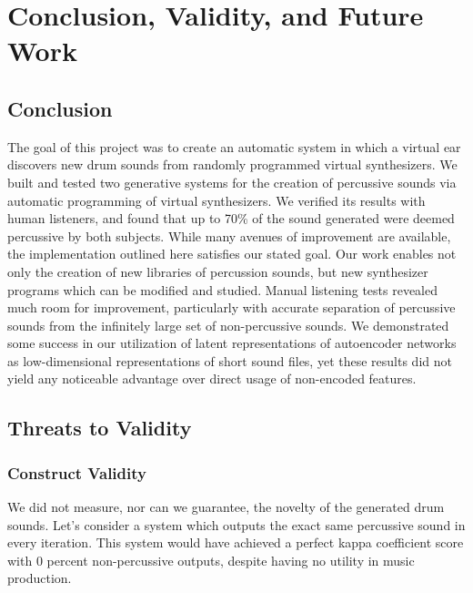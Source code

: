 \documentclass[\main/thesis.tex]{subfiles}
\begin{document}
\chapter{Conclusion, Validity, and Future Work} 

\section{Conclusion}  The goal of this project was to create an automatic system in which a virtual ear discovers new drum sounds from randomly programmed virtual synthesizers. We built and tested two generative systems for the creation of percussive sounds via automatic programming of virtual synthesizers. We verified its results with human listeners, and found that up to 70\% of the sound generated were deemed percussive by both subjects. While many avenues of improvement are available, the implementation outlined here satisfies our stated goal. 
Our work enables not only the creation of new libraries of percussion sounds, but new synthesizer programs which can be modified and studied. 
Manual listening tests revealed much room for improvement, particularly with accurate separation of percussive sounds from the infinitely large set of non-percussive sounds. We demonstrated some success in our utilization of latent representations of autoencoder networks as low-dimensional representations of short sound files, yet these results did not yield any noticeable advantage over direct usage of non-encoded features.
\section{Threats to Validity}
 
\subsection{Construct Validity}
  We did not measure, nor can we guarantee, the novelty of the generated drum sounds. Let's consider a system which outputs the exact same percussive sound in every iteration. This system would have achieved a perfect kappa coefficient score with 0 percent non-percussive outputs, despite having no utility in music production. 
  
\end{document}
